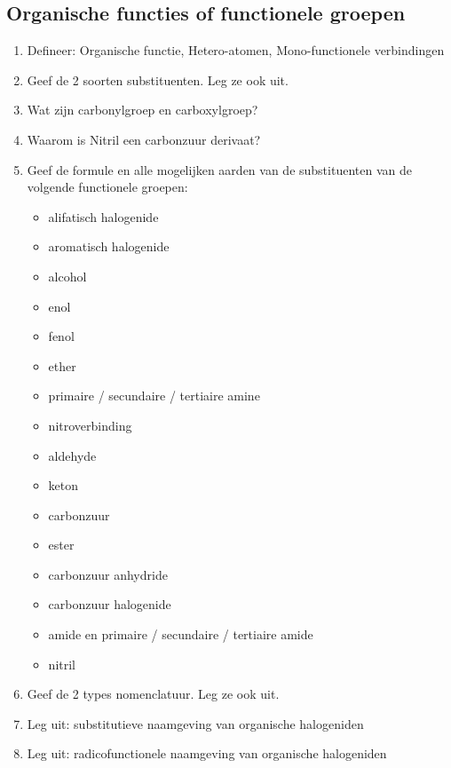 \documentclass[a4paper,12pt]{article}
\begin{document}
\begin{enumerate}
        \subsection*{Organische functies of functionele groepen}
        \begin{enumerate}
            \item Defineer: Organische functie, Hetero-atomen, Mono-functionele verbindingen
            \item Geef de 2 soorten substituenten. Leg ze ook uit.
            \item Wat zijn carbonylgroep en carboxylgroep?
            \item Waarom is Nitril een carbonzuur derivaat?
            \item Geef de formule en alle mogelijken aarden van de substituenten van de volgende functionele groepen:
                \begin{itemize}
                    \item alifatisch halogenide
                    \item aromatisch halogenide
                    \item alcohol
                    \item enol
                    \item fenol
                    \item ether
                    \item primaire / secundaire / tertiaire amine 
                    \item nitroverbinding
                    \item aldehyde
                    \item keton 
                    \item carbonzuur
                    \item ester
                    \item carbonzuur anhydride
                    \item carbonzuur halogenide
                    \item amide en primaire / secundaire / tertiaire amide
                    \item nitril
                \end{itemize}
            \item Geef de 2 types nomenclatuur. Leg ze ook uit.
            \item Leg uit: substitutieve naamgeving van organische halogeniden
            \item Leg uit: radicofunctionele naamgeving van organische halogeniden

\end{enumerate}
\end{enumerate}
\end{document}
